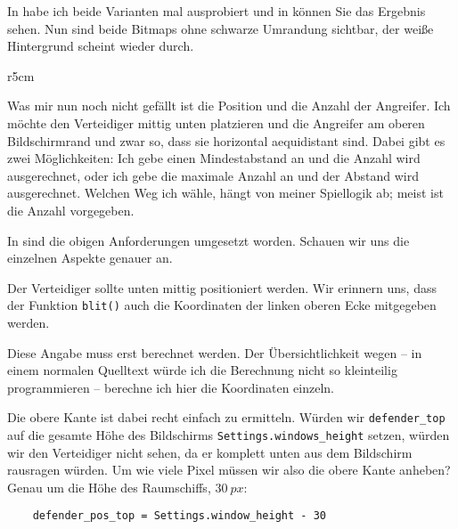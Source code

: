 

In  habe ich beide Varianten mal ausprobiert und in  können Sie das Ergebnis sehen. Nun sind beide Bitmaps ohne schwarze Umrandung sichtbar, der weiße Hintergrund scheint wieder durch.

\begin{wrapfigure}[8]{r}{5cm}
\end{wrapfigure}Was mir nun noch nicht gefällt ist die Position und die Anzahl der Angreifer. Ich möchte den Verteidiger mittig unten platzieren und die Angreifer am oberen Bildschirmrand und zwar so, dass sie horizontal  \gls{aequidistant} sind. Dabei gibt es zwei Möglichkeiten: Ich gebe einen Mindestabstand an und die Anzahl wird ausgerechnet, oder ich gebe die maximale Anzahl an und der Abstand wird ausgerechnet. Welchen Weg ich wähle, hängt von meiner Spiellogik ab; meist ist die Anzahl vorgegeben.


In  sind die obigen Anforderungen umgesetzt worden. Schauen wir uns die einzelnen Aspekte genauer an.

Der Verteidiger sollte unten mittig positioniert werden. Wir erinnern uns, dass der Funktion \texttt{blit()} auch die Koordinaten der linken oberen Ecke mitgegeben werden. 

Diese Angabe muss erst berechnet werden. Der Übersichtlichkeit wegen -- in einem normalen Quelltext würde ich die Berechnung nicht so kleinteilig programmieren -- berechne ich hier die Koordinaten einzeln.

Die obere Kante ist dabei recht einfach zu ermitteln. Würden wir \texttt{defender\_top} auf die gesamte Höhe des Bildschirms \texttt{Settings.windows\_height} setzen, würden wir den Verteidiger nicht sehen, da er komplett unten aus dem Bildschirm rausragen würden. Um wie viele Pixel müssen wir also die obere Kante anheben? Genau um die Höhe des Raumschiffs, $30~px$:

\lstset{firstnumber=24}
\begin{lstlisting}
	defender_pos_top = Settings.window_height - 30
\end{lstlisting}

